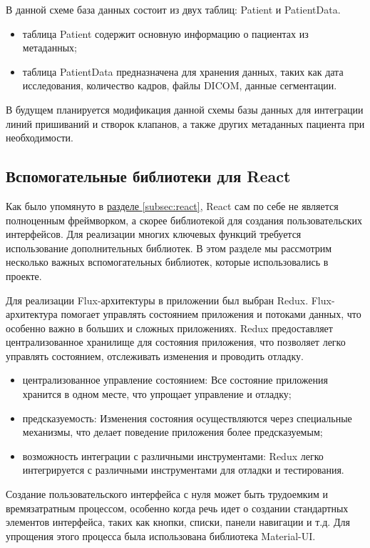 В данной схеме база данных состоит из двух таблиц: Patient и PatientData.

\begin{itemize}
    \item таблица Patient содержит основную информацию о пациентах из метаданных;
    \item таблица PatientData предназначена для хранения данных, таких как дата исследования, количество кадров, файлы DICOM, данные сегментации.
\end{itemize}

В будущем планируется модификация данной схемы базы данных для интеграции линий пришиваний и створок клапанов, а также других метаданных пациента при необходимости.

\subsection{Вспомогательные библиотеки для React}

Как было упомянуто в \hyperref[subsec:react]{разделе \ref{subsec:react}}, React сам по себе не является полноценным фреймворком, а скорее библиотекой для создания пользовательских интерфейсов. Для реализации многих ключевых функций требуется использование дополнительных библиотек. В этом разделе мы рассмотрим несколько важных вспомогательных библиотек, которые использовались в проекте.

Для реализации Flux-архитектуры в приложении был выбран Redux. Flux-архитектура помогает управлять состоянием приложения и потоками данных, что особенно важно в больших и сложных приложениях. Redux предоставляет централизованное хранилище для состояния приложения, что позволяет легко управлять состоянием, отслеживать изменения и проводить отладку.

\begin{itemize}
    \item централизованное управление состоянием: Все состояние приложения хранится в одном месте, что упрощает управление и отладку;
    \item предсказуемость: Изменения состояния осуществляются через специальные механизмы, что делает поведение приложения более предсказуемым;
    \item возможность интеграции с различными инструментами: Redux легко интегрируется с различными инструментами для отладки и тестирования.
\end{itemize}

Создание пользовательского интерфейса с нуля может быть трудоемким и времязатратным процессом, особенно когда речь идет о создании стандартных элементов интерфейса, таких как кнопки, списки, панели навигации и т.д. Для упрощения этого процесса была использована библиотека Material-UI.


